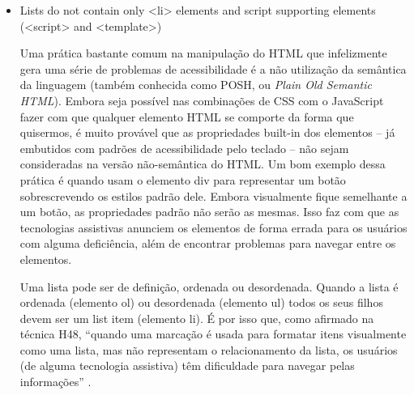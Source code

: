\documentclass[
	12pt,				%
	openright,			%
	oneside,			%
	a4paper,			%
	chapter=TITLE,		%
	section=TITLE,		%
	subsection=TITLE,	%
	subsubsection=TITLE,%
	english,			%
	brazil				%
	]{abntex2}
\theoremstyle{definition}
\begin{document}
\begin{itemize}
Para resolver esse problema basta adicionar algum valor ao atributo alt da tag img. Alternativamente, também é possível utilizar a aria-label, considerando que é uma situação muito próxima da analisada anteriormente no ponto 5.2.10, onde era necessário um texto descritivo para o elemento sem que ele fosse renderizado de fato na página. A figura \ref{Acréscimo de aria-label a um link sem texto descritivo} representa a implementação dessa solução.

\begin{figure}[!h]
\centering
\caption{Acréscimo de aria-label a um link sem texto descritivo}
\label{Acréscimo de aria-label a um link sem texto descritivo}
\end{figure}

\pagebreak

 \item Lists do not contain only <li> elements and script supporting elements (<script> and <template>)
   
Uma prática bastante comum na manipulação do HTML que infelizmente gera uma série de problemas de acessibilidade é a não utilização da semântica da linguagem (também conhecida como POSH, ou \textit{Plain Old Semantic HTML}). Embora seja possível nas combinações de CSS com o JavaScript fazer com que qualquer elemento HTML se comporte da forma que quisermos, é muito provável que as propriedades built-in dos elementos – já embutidos com padrões de acessibilidade pelo teclado – não sejam consideradas na versão não-semântica do HTML. Um bom exemplo dessa prática é quando usam o elemento div para representar um botão sobrescrevendo os estilos padrão dele. Embora visualmente fique semelhante a um botão, as propriedades padrão não serão as mesmas. Isso faz com que as tecnologias assistivas anunciem os elementos de forma errada para os usuários com alguma deficiência, além de encontrar problemas para navegar entre os elementos.

Uma lista pode ser de definição, ordenada ou desordenada. Quando a lista é ordenada (elemento ol) ou desordenada (elemento ul) todos os seus filhos devem ser um list item  (elemento li). É por isso que, como  afirmado na técnica H48, “quando uma marcação é usada para formatar itens visualmente como uma lista, mas  não representam o relacionamento da lista, os usuários (de alguma tecnologia assistiva) têm dificuldade para navegar pelas informações” \cite{cooper2010techniques}.


\end{itemize}
\end{document}
